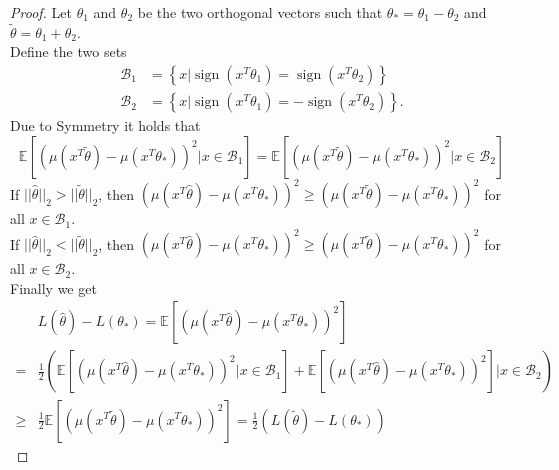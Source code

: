 \documentclass[twoside]{article} \usepackage{aistats2017}
\newcommand{\EV}[1] {
  \mathbb{E}\left[#1\right]}
\newcommand{\sign} {
  \operatorname{sign}}
\begin{document}
\begin{proof}
Let $\theta_1$ and $\theta_2$ be the two orthogonal vectors such that $\theta_* = \theta_1-\theta_2$ and $\tilde{\theta}=\theta_1+\theta_2$.\\
Define the two sets
\begin{align*}
\mathcal{B}_1 &= \left\{x|\sign(x^T\theta_1)=\sign(x^T\theta_2)\right\}\\ 
\mathcal{B}_2 &= \left\{x|\sign(x^T\theta_1)=-\sign(x^T\theta_2)\right\}.
\end{align*}
Due to Symmetry it holds that 
$$\EV{(\mu(x^T\tilde{\theta})-\mu(x^T\theta_*))^2|x\in\mathcal{B}_1}=\EV{(\mu(x^T\tilde{\theta})-\mu(x^T\theta_*))^2|x\in\mathcal{B}_2}$$
If $||\hat{\theta}||_2 > ||\tilde{\theta}||_2$, then $(\mu(x^T\hat{\theta})-\mu(x^T\theta_*))^2 \geq (\mu(x^T\tilde{\theta})-\mu(x^T\theta_*))^2$ for all $x\in \mathcal{B}_1$.\\
If $||\hat{\theta}||_2 < ||\tilde{\theta}||_2$, then $(\mu(x^T\hat{\theta})-\mu(x^T\theta_*))^2 \geq (\mu(x^T\tilde{\theta})-\mu(x^T\theta_*))^2$ for all $x\in \mathcal{B}_2$.\\
Finally we get
\begin{align*}
     &L(\hat{\theta})-L(\theta_*) = \EV{(\mu(x^T\hat{\theta})-\mu(x^T\theta_*))^2}\\
     =& \frac{1}{2}\left(\EV{(\mu(x^T\hat{\theta})-\mu(x^T\theta_*))^2|x\in\mathcal{B}_1}+\EV{(\mu(x^T\hat{\theta})-\mu(x^T\theta_*))^2}|x\in\mathcal{B}_2\right)\\
     \geq& \frac{1}{2}\EV{(\mu(x^T\tilde{\theta})-\mu(x^T\theta_*))^2}=\frac{1}{2}(L(\tilde{\theta})-L(\theta_*))
\end{align*}
\end{proof}
\end{document}
